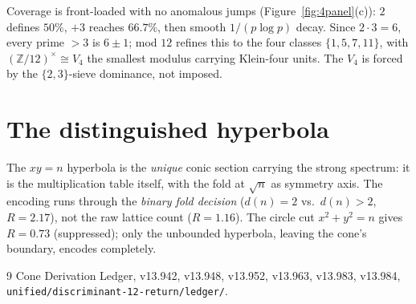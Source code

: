 \documentclass[11pt]{amsart}
\theoremstyle{remark}
\begin{document}
Coverage is front-loaded with no anomalous jumps (Figure~\ref{fig:4panel}(c)):
$2$ defines $50\%$, $+3$ reaches $66.7\%$, then smooth
$1/(p\log p)$ decay.  Since $2\cdot3=6$, every prime $>3$ is
$6\pm1$; mod $12$ refines this to the four classes
$\{1,5,7,11\}$, with $(\mathbb{Z}/12)^\times\cong V_4$ the
smallest modulus carrying Klein-four units.  The $V_4$ is forced
by the $\{2,3\}$-sieve dominance, not imposed.

\section{The distinguished hyperbola}
The $xy=n$ hyperbola is the \emph{unique} conic section carrying
the strong spectrum: it is the multiplication table itself, with
the fold at $\sqrt{n}$ as symmetry axis.  The encoding runs
through the \emph{binary fold decision} ($d(n)=2$ vs.\ $d(n)>2$,
$R=2.17$), not the raw lattice count ($R=1.16$).  The circle cut
$x^2+y^2=n$ gives $R=0.73$ (suppressed); only the unbounded
hyperbola, leaving the cone's boundary, encodes completely.


\begin{thebibliography}{9}
Cone Derivation Ledger, v13.942, v13.948, v13.952, v13.963, v13.983, v13.984,
\texttt{unified/discriminant-12-return/ledger/}.
\end{thebibliography}
\end{document}
